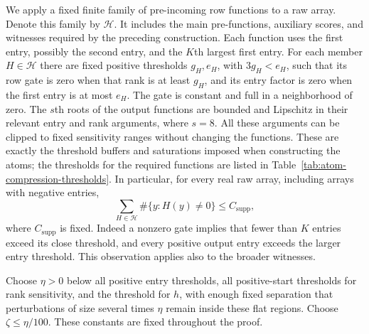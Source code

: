 We apply a fixed finite family of pre-incoming row functions to a raw array.
Denote this family by $\mathcal H$.  It includes the main pre-functions,
auxiliary scores, and witnesses required by the preceding construction.
Each function uses the first entry, possibly the second entry, and the
$K$th largest first entry.  For each member $H\in\mathcal H$ there are fixed
positive thresholds $g_H,e_H$, with $3g_H<e_H$, such that its row gate is
zero when that rank is at least $g_H$, and its entry factor is zero when the
first entry is at most $e_H$.  The gate is constant and full in a neighborhood
of zero.  The $s$th roots of the output functions are bounded and Lipschitz
in their relevant entry and rank arguments, where $s=8$.  All these arguments
can be clipped to fixed sensitivity ranges without changing the functions.
These are exactly the threshold buffers and saturations imposed when
constructing the atoms; the thresholds for the required functions are
listed in Table~\ref{tab:atom-compression-thresholds}.  In particular,
for every real raw array, including
arrays with negative entries,
\begin{equation}
 \sum_{H\in\mathcal H}\#\{y:H(y)\ne0\}\leq C_{\mathrm{supp}},
 \label{eq:buf-row-support}
\end{equation}
where $C_{\mathrm{supp}}$ is fixed.  Indeed a nonzero gate implies that fewer
than $K$ entries exceed its close threshold, and every positive output entry
exceeds the larger entry threshold.  This observation applies also to the
broader witnesses.

Choose $\eta>0$ below all positive entry thresholds, all positive-start
thresholds for rank sensitivity, and the threshold for $h$, with enough
fixed separation that perturbations of size several times $\eta$ remain
inside these flat regions.  Choose $\zeta\leq\eta/100$.  These constants are
fixed throughout the proof.

